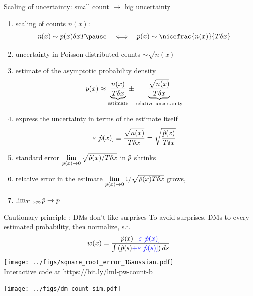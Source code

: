 \begin{frame}{Scaling of uncertainty: small count $\rightarrow$ big uncertainty}
\begin{enumerate}[<+->]
  \item scaling of counts $n(x)$:
  	$$n(x) \sim p(x)\dx T \pause \quad \Longleftrightarrow \quad p(x) \sim \nicefrac{n(x)}{T\dx}$$
  \item uncertainty in Poisson-distributed counts $\sim \sqrt{n(x)}$
  \item estimate of the asymptotic probability density
  \begin{equation}
    	p(x) \approx \underbrace{\frac{n(x)}{T\delta x}\strut}_{\text{estimate}} \pm \underbrace{\frac{\sqrt{n(x)}}{T\delta x}\mathstrut}_{\text{relative uncertainty}}
  \end{equation}
  \item express the uncertainty in terms of the estimate itself
  \begin{equation}
    \varepsilon\left[\hat{p}(x)\right]	\equiv \frac{\sqrt{n(x)}}{T \delta x} = \sqrt{\frac{\hat{p}(x)}{T\delta x}}
  \end{equation}
  \item standard error $ \lim\limits_{p(x) \to 0} \sqrt{\hat{p}(x)/T \delta x}$ in $\hat{p}$ shrinks
  \item relative error in the estimate $\lim\limits_{p(x) \to 0} 1/\sqrt{\hat{p}(x)T\delta x}$ grows,
  \item \textbf{}  $\lim_{T \to \infty} \hat{p} \to p$ 
  \hspace{2cm} 
\end{enumerate}
\end{frame}

\begin{frame}{Cautionary principle : DMs don't like surprises}
To avoid surprises, DMs  to every estimated probability, then normalize, s.t.
\begin{equation}
	w(x)=\frac{\hat{p}(x)\textcolor{blue}{+\varepsilon\left[\hat{p}(x)\right]}}{\int \left(\hat{p}(s) \textcolor{blue}{+\varepsilon\left[\hat{p}(s)\right]} \right)ds}
\end{equation}
\pause
\centering
	\texttt{[image: ../figs/square\_root\_error\_1Gaussian.pdf]} \\
	Interactive code at \url{https://bit.ly/lml-pw-count-b}
\end{frame}

\begin{frame}%
\begin{center}
	\texttt{[image: ../figs/dm\_count\_sim.pdf]}\\
\end{center}
\end{frame}

